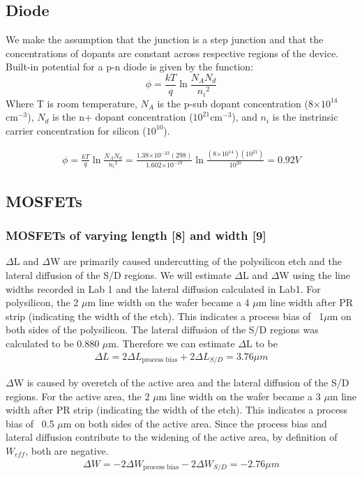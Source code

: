 \documentclass{article}
\providecommand{\e}[1]{\ensuremath{\times 10^{#1}}}
\begin{document}
\subsection{Diode}
We make the assumption that the junction is a step junction and that the concentrations of dopants are constant across respective regions of the device. Built-in potential for a p-n diode is given by the function:
\begin{equation}
\phi = \frac{kT}{q}\ln{\frac{N_AN_d}{{n_i}^{2}}}
\end{equation}
Where T is room temperature, $N_A$ is the p-sub dopant concentration (8\e{14}${\text{cm}^{-3}}$), $N_d$ is the n+ dopant concentration ($10^{21}{\text{cm}^{-3}}$), and $n_i$ is the instrinsic carrier concentration for silicon ($10^{10}$).

\begin{align*}
\phi = \frac{kT}{q}\ln{\frac{N_AN_d}{{n_i}^{2}}} = \frac{1.38\e{-23}(298)}{1.602\e{-19}}\ln{\frac{(8\e{14})(10^{21})}{{10^{20}}}} = 0.92 V
\end{align*}

\subsection{MOSFETs}
\subsubsection{MOSFETs of varying length [8] and width [9]}
$\Delta$L and $\Delta$W are primarily caused undercutting of the polysilicon etch and the lateral diffusion of the S/D regions. We will estimate $\Delta$L and $\Delta$W using the line widths recorded in Lab 1 and the lateral diffusion calculated in Lab1. For polysilicon, the 2 $\mu$m line width on the wafer became a 4 $\mu$m line width after PR strip (indicating the width of the etch). This indicates a process bias of ~1$\mu$m on both sides of the polysilicon. The lateral diffusion of the S/D regions was calculated to be 0.880 $\mu$m. Therefore we can estimate $\Delta$L to be
\begin{align*}
\Delta L = 2\Delta L_{\text{process bias}} + 2 \Delta L_{S/D} = 3.76 \mu m
\end{align*}

$\Delta$W is caused by overetch of the active area and the lateral diffusion of the S/D regions. For the active area, the 2 $\mu$m line width on the wafer became a 3 $\mu$m line width after PR strip (indicating the width of the etch). This indicates a process bias of ~0.5 $\mu$m on both sides of the active area. Since the process bias and lateral diffusion contribute to the widening of the active area, by definition of $W_{eff}$, both are negative.
\begin{align*}
\Delta W = -2\Delta W_{\text{process bias}}- 2\Delta W_{S/D} =-2.76 \mu m 
\end{align*}
\end{document}
